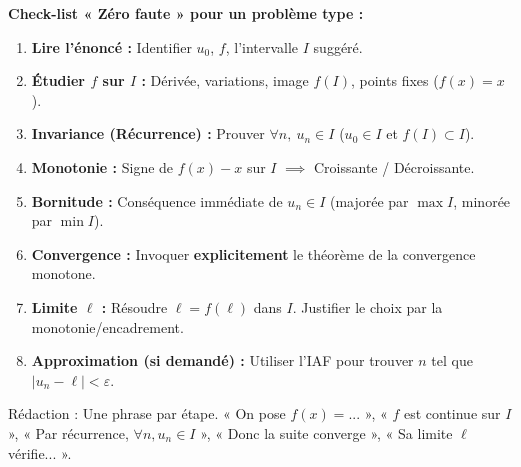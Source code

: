 \documentclass[11pt]{article}
\newcommand{\cle}[1]{{\popxbold\color{popdark}#1}}
\begin{document}
\begin{methode}
\textbf{Check-list « Zéro faute » pour un problème type :}
\begin{enumerate}
    \item \textbf{Lire l'énoncé :} Identifier $u_0$, $f$, l'intervalle $I$ suggéré.
    \item \textbf{Étudier $f$ sur $I$ :} Dérivée, variations, image $f(I)$, points fixes ($f(x)=x$).
    \item \textbf{Invariance (Récurrence) :} Prouver $\forall n,\ u_n \in I$ ($u_0 \in I$ et $f(I) \subset I$).
    \item \textbf{Monotonie :} Signe de $f(x)-x$ sur $I$ $\implies$ Croissante / Décroissante.
    \item \textbf{Bornitude :} Conséquence immédiate de $u_n \in I$ (majorée par $\max I$, minorée par $\min I$).
    \item \textbf{Convergence :} Invoquer \textbf{explicitement} le théorème de la convergence monotone.
    \item \textbf{Limite $\ell$ :} Résoudre $\ell = f(\ell)$ dans $I$. Justifier le choix par la monotonie/encadrement.
    \item \textbf{Approximation (si demandé) :} Utiliser l'IAF pour trouver $n$ tel que $|u_n-\ell| < \varepsilon$.
\end{enumerate}
\cle{Rédaction :} Une phrase par étape. « On pose $f(x)=...$ », « $f$ est continue sur $I$ », « Par récurrence, $\forall n, u_n \in I$ », « Donc la suite converge », « Sa limite $\ell$ vérifie... ».
\end{methode}
\end{document}
